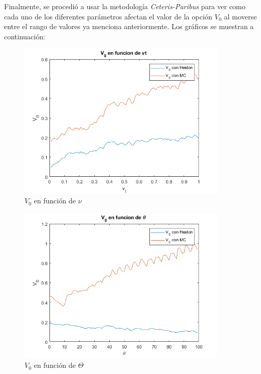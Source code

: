 Finalmente, se procedió a usar la metodología \textit{Ceteris-Paribus} para ver como cada uno de los diferentes parámetros afectan el valor de la opción $V_0$ al moverse entre el rango de valores ya menciona anteriormente. Los gráficos se muestran a continuación:

\begin{figure}[H]
    \begin{center}
    \includegraphics[width = 10cm]{figures/Paso6-1.png}
    \caption{$V_0$ en función de $\nu$}
    \end{center}
\end{figure}

\begin{figure}[H]
    \begin{center}
    \includegraphics[width = 10cm]{figures/Paso6-2.png}
    \caption{$V_0$ en función de $\Theta$}
    \end{center}
\end{figure}

